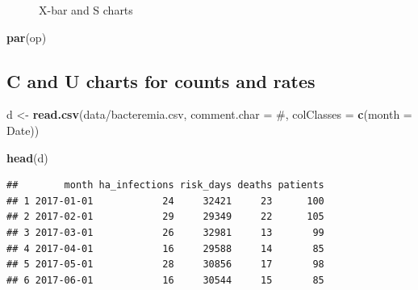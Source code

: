 \documentclass[
]{book}
\makeatletter
\newenvironment{Shaded}{\begin{snugshade}}{\end{snugshade}}
\newcommand{\AttributeTok}[1]{\textcolor[rgb]{0.13,0.29,0.53}{#1}}
\newcommand{\FunctionTok}[1]{\textcolor[rgb]{0.13,0.29,0.53}{\textbf{#1}}}
\newcommand{\NormalTok}[1]{#1}
\newcommand{\OtherTok}[1]{\textcolor[rgb]{0.56,0.35,0.01}{#1}}
\newcommand{\StringTok}[1]{\textcolor[rgb]{0.31,0.60,0.02}{#1}}
\newcommand*\pandocbounded[1]{%
  \sbox\pandoc@box{#1}%
  \Gscale@div\@tempa{\textheight}{\dimexpr\ht\pandoc@box+\dp\pandoc@box\relax}%
  \Gscale@div\@tempb{\linewidth}{\wd\pandoc@box}%
  \ifdim\@tempb\p@<\@tempa\p@\let\@tempa\@tempb\fi%
  \ifdim\@tempa\p@<\p@\scalebox{\@tempa}{\usebox\pandoc@box}%
  \else\usebox{\pandoc@box}%
  \fi%
}
\makeatother
\begin{document}
\begin{figure}
\centering
\pandocbounded{}
\caption{\label{fig:rfun-xbars}X-bar and S charts}
\end{figure}

\begin{Shaded}
\begin{Highlighting}[]
\FunctionTok{par}\NormalTok{(op)}
\end{Highlighting}
\end{Shaded}

\subsection{C and U charts for counts and rates}\label{c-and-u-charts-for-counts-and-rates}

\begin{Shaded}
\begin{Highlighting}[]
\NormalTok{d }\OtherTok{\textless{}{-}} \FunctionTok{read.csv}\NormalTok{(}\StringTok{\textquotesingle{}data/bacteremia.csv\textquotesingle{}}\NormalTok{,}
         \AttributeTok{comment.char =} \StringTok{\textquotesingle{}\#\textquotesingle{}}\NormalTok{,}
         \AttributeTok{colClasses =} \FunctionTok{c}\NormalTok{(}\AttributeTok{month =} \StringTok{\textquotesingle{}Date\textquotesingle{}}\NormalTok{))}

\FunctionTok{head}\NormalTok{(d)}
\end{Highlighting}
\end{Shaded}

\begin{verbatim}
##        month ha_infections risk_days deaths patients
## 1 2017-01-01            24     32421     23      100
## 2 2017-02-01            29     29349     22      105
## 3 2017-03-01            26     32981     13       99
## 4 2017-04-01            16     29588     14       85
## 5 2017-05-01            28     30856     17       98
## 6 2017-06-01            16     30544     15       85
\end{verbatim}
\end{document}

